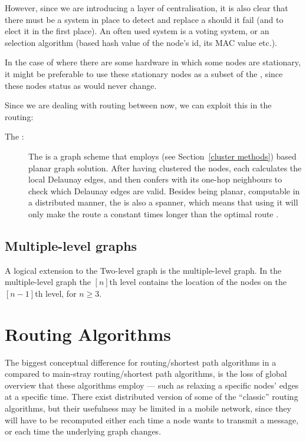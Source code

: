 \documentclass[letter, 12pt, english, draft]{article}
\begin{document}
However, since we are introducing a layer of centralisation, it is also clear that there must be a system in place to detect and replace a \ch should it fail (and to elect it in the first place). An often used system is a voting system, or an selection algorithm (based hash value of the node's id, its MAC value etc.).

In the case of \manet where there are some hardware in which some nodes are stationary, it might be preferable to use these stationary nodes as a subset of the \ch, since these nodes status as \ch would never change.

Since we are dealing with routing between \ch now, we can exploit this in the routing:
\begin{description}
\item[The \rdg:] The \rdg is a graph scheme that employs \ch (see Section~\ref{cluster methods}) based planar graph solution. After having clustered the nodes, each \ch calculates the local Delaunay edges, and then confers with its one-hop neighbours to check which Delaunay edges are valid. Besides being planar, computable in a distributed manner, the \rdg is also a spanner, which means that using it will only make the route a constant times longer than the optimal route \cite{GeoSpanners}.
\end{description}

\subsection{Multiple-level graphs}
A logical extension to the Two-level graph is the multiple-level graph. In the multiple-level graph the $[n]$th level contains the location of the nodes on the $[n-1]$th level, for $n \geq 3$. 

\section{Routing Algorithms}

The biggest conceptual difference for routing/shortest path algorithms in a \manet compared to main-stray routing/shortest path algorithms, is the loss of global overview that these algorithms employ --- such as relaxing a specific nodes' edges at a specific time. There exist distributed version of some of the ``classic'' routing algorithms, but their usefulness may be limited in a mobile network, since they will have to be recomputed either each time a node wants to transmit a message, or each time the underlying graph changes.
\end{document}
